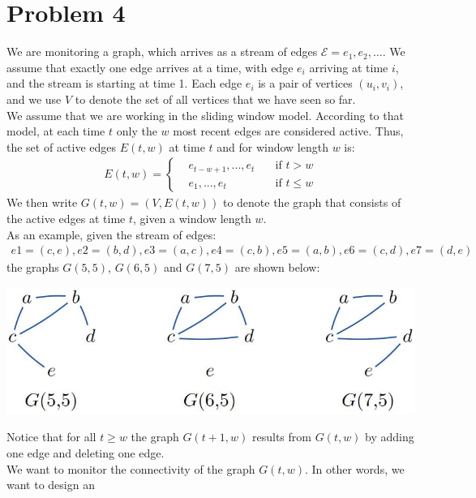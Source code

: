
\section{Problem 4}

We are monitoring a graph, which arrives as a stream of edges $\mathcal{E} = e_1, e_2, \ldots$. We
assume that exactly one edge arrives at a time, with edge $e_{i}$ arriving at time $i$, and the stream is starting at time 1. Each edge $e_{i}$ is a pair of vertices $(u_{i},v_{i})$, and we use $V$ to denote the set of all vertices that we have seen so far.\\
We assume that we are working in the sliding window model. According to that model, at each
time $t$ only the $w$ most recent edges are considered active. Thus, the set of active edges $E(t,w)$ at time $t$ and for window length $w$ is:
\begin{align*}
E(t,w) = 
	\left\{ \begin{aligned}
		&e_{t-w+1}, . . . ,e_t &\quad\text{if }t > w\\
		&e_1, . . . ,e_t &\quad\text{if }t \le  w
	\end{aligned}\right.
\end{align*}
We then write $G(t,w) = (V,E(t,w))$ to denote the graph that consists of the active edges at time $t$, given a window length $w$.\\
As an example, given the stream of edges:
\begin{align*}
	e1 = (c,e), e2 = (b,d), e3 = (a,c), e4 = (c,b), e5 = (a,b), e6 = (c,d), e7 = (d,e)
\end{align*}
the graphs $G(5,5)$, $G(6,5)$ and $G(7,5)$ are shown below:
\begin{center}
	\includegraphics[scale=0.5]{img/example_graphs.jpg}
\end{center}
Notice that for all $t \ge w$ the graph $G(t+1,w)$ results from $G(t,w)$ by adding one edge and deleting one edge.\\
We want to monitor the connectivity of the graph $G(t,w)$. In other words, we want to design an

